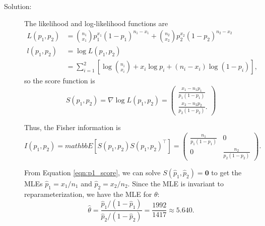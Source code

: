 \documentclass[letterpaper,11pt]{article}
\begin{document}
\begin{enumerate}
\begin{enumerate}
    \begin{description}
    \item[Solution:]
      The likelihood and log-likelihood functions are
      \begin{align}
        L\left(p_1,p_2\right)
        &= {n_1 \choose x_1}p_1^{x_1}\left(1 - p_1\right)^{n_1 - x_1} +
          {n_2 \choose x_2}p_2^{x_2}\left(1 - p_2\right)^{n_2 - x_2}
          \label{eqn:p1_likelihood}\\
        l\left(p_1,p_2\right)
        &= \log L\left(p_1,p_2\right) \nonumber\\
        &= \sum_{i=1}^2\left[
          \log {n_i \choose x_i} + x_i \log p_i + \left(n_i - x_i\right)\log\left(1 - p_i\right)
          \right],
        \nonumber
      \end{align}
      so the score function is
      \begin{equation}
        S\left(p_1,p_2\right)
        = \nabla \log L\left(p_1,p_2\right)
        = \begin{pmatrix}
          \frac{x_1 - n_1p_1}{p_1\left(1 - p_1\right)} \\
          \frac{x_2 - n_2p_2}{p_2\left(1 - p_2\right)}.
        \end{pmatrix}
        \label{eqn:p1_score}
      \end{equation}
      
      Thus, the Fisher information is
      \begin{equation}
        I\left(p_1,p_2\right) = mathbb{E}\left[
          S\left(p_1,p_2\right)S\left(p_1,p_2\right)^\intercal
        \right]= \begin{pmatrix}
          \frac{n_1}{p_1\left(1 - p_1\right)} & 0 \\
          0 & \frac{n_2}{p_2\left(1 - p_2\right)}
        \end{pmatrix}.
        \label{eqn:p1_fisher_information}
      \end{equation}

      From Equation \ref{eqn:p1_score}, we can solve
      $S\left(\hat{p}_1,\hat{p}_2\right) = \mathbf{0}$ to get the MLEs
      $\hat{p}_1 = x_1/n_1$ and $\hat{p}_2 = x_2/n_2$. Since the MLE is
      invariant to reparameterization, we have the MLE for $\theta$:
      \begin{equation}
        \boxed{\hat{\theta} = \frac{\hat{p}_1/\left(1 - \hat{p}_1\right)}{\hat{p}_2/\left(1 - \hat{p}_2\right)} = \frac{1992}{1417} \approx 5.640.}
      \end{equation}


\end{description}
\end{enumerate}
\end{enumerate}
\end{document}

